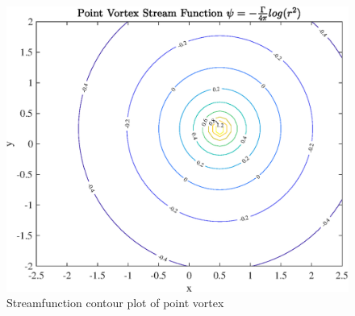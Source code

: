 



\justify
\begin{figure}[H]
\centering
\includegraphics[scale=0.53]{graphs/e1g1.eps}
\caption{Streamfunction contour plot of point vortex}
\label{e1g1}
\end{figure}